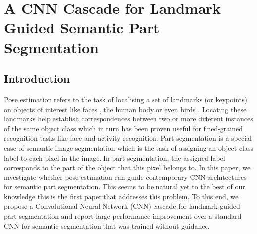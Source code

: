 \graphicspath{{chapter_seg/}}
\chapter{A CNN Cascade for Landmark Guided Semantic Part Segmentation}



\section{Introduction}

Pose estimation refers to the task of localising a set of landmarks
(or keypoints) on objects of interest like faces
\cite{cootes2001active}, the human body \cite{yang2011articulated} or
even birds \cite{zhang2015fine}. Locating these landmarks help
establish correspondences between two or more different instances of
the same object class which in turn has been proven useful for
fined-grained recognition tasks like face and activity
recognition. Part segmentation is a special case of semantic image
segmentation which is the task of assigning an object class label to
each pixel in the image. In part segmentation, the assigned label
corresponds to the part of the object that this pixel belongs to. In
this paper, we investigate whether pose estimation can guide
contemporary CNN architectures for semantic part segmentation. This
seems to be natural yet to the best of our knowledge this is the first
paper that addresses this problem. To this end, we propose a
Convolutional Neural Network (CNN) cascade for landmark guided part
segmentation and report large performance improvement over a standard
CNN for semantic segmentation that was trained without guidance.

